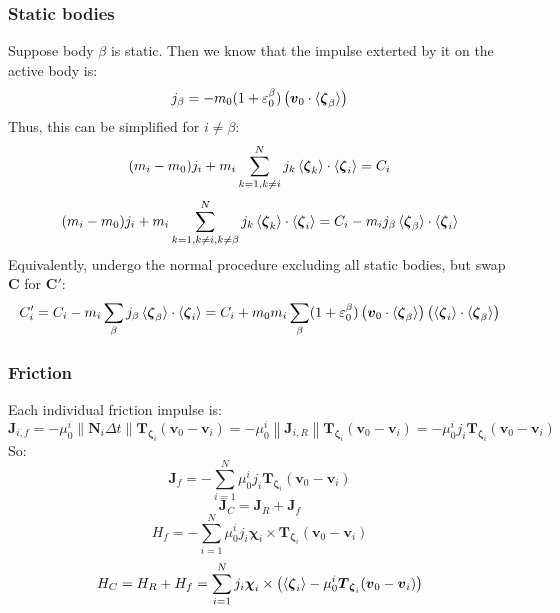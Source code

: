 \documentclass[10pt]{report}
\begin{document}
\subsubsection{Static bodies}
Suppose body $\beta$ is static. Then we know that the impulse exterted by it on the active body is:
\begin{equation}j_\beta=-m_0(1+\varepsilon_0^\beta)\left(\boldsymbol{v}_0\cdot\braket{\boldsymbol{\zeta}_\beta}\right)\end{equation}
Thus, this can be simplified for $i\neq\beta$:
\begin{equation}(m_i-m_0)j_i+m_i\sum_{k=1,k\neq i}^Nj_k\braket{\boldsymbol{\zeta}_k}\cdot\braket{\boldsymbol{\zeta}_i}=C_i\end{equation}
\begin{equation}(m_i-m_0)j_i+m_i\sum_{k=1,k\neq i,k\neq\beta}^Nj_k\braket{\boldsymbol{\zeta}_k}\cdot\braket{\boldsymbol{\zeta}_i}=C_i-m_ij_\beta\braket{\boldsymbol{\zeta}_\beta}\cdot\braket{\boldsymbol{\zeta}_i}\end{equation}
Equivalently, undergo the normal procedure excluding all static bodies, but swap $\boldsymbol{C}$ for $\boldsymbol{C}'$:
\begin{equation}C_i'=C_i-m_i\sum_\beta j_\beta\braket{\boldsymbol{\zeta}_\beta}\cdot\braket{\boldsymbol{\zeta}_i}=C_i+m_0m_i\sum_\beta(1+\varepsilon_0^\beta)\left(\boldsymbol{v}_0\cdot\braket{\boldsymbol{\zeta}_\beta}\right)\left(\braket{\boldsymbol{\zeta}_i}\cdot\braket{\boldsymbol{\zeta}_\beta}\right)\end{equation}

\subsubsection{Friction}
Each individual friction impulse is:
\begin{equation}\boldsymbol{J}_{i,f}=-\mu_0^i\|\boldsymbol{N}_i\Delta t\|\boldsymbol{T}_{\boldsymbol{\zeta}_i}(\boldsymbol{v}_0-\boldsymbol{v}_i)=-\mu_0^i\left\|\boldsymbol{J}_{i,R}\right\|\boldsymbol{T}_{\boldsymbol{\zeta}_i}(\boldsymbol{v}_0-\boldsymbol{v}_i)=-\mu_0^ij_i\boldsymbol{T}_{\boldsymbol{\zeta}_i}(\boldsymbol{v}_0-\boldsymbol{v}_i)\end{equation}
So:
\begin{equation}\boldsymbol{J}_f=-\sum_{i=1}^N\mu_0^ij_i\boldsymbol{T}_{\boldsymbol{\zeta}_i}(\boldsymbol{v}_0-\boldsymbol{v}_i)\end{equation}
\begin{equation}\boldsymbol{J}_C=\boldsymbol{J}_R+\boldsymbol{J}_f\end{equation}
\begin{equation}H_f=-\sum_{i=1}^N\mu_0^ij_i\boldsymbol{\chi}_i\times\boldsymbol{T}_{\boldsymbol{\zeta}_i}(\boldsymbol{v}_0-\boldsymbol{v}_i)\end{equation}
\begin{equation}H_C=H_R+H_f=\sum_{i=1}^Nj_i\boldsymbol{\chi}_i\times\left(\braket{\boldsymbol{\zeta}_i}-\mu_0^i\boldsymbol{T}_{\boldsymbol{\zeta}_i}(\boldsymbol{v}_0-\boldsymbol{v}_i)\right)\end{equation}
\end{document}
